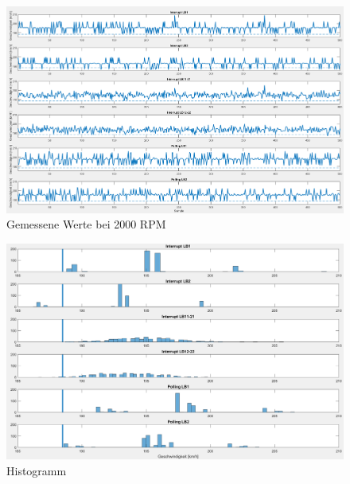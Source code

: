 \begin{figure}[H]
    \centering
    \includegraphics[width=\textwidth]{images/sig2000.png}
    \caption{Gemessene Werte bei 2000 RPM}
    \label{fig:sig2000}
\end{figure}
\begin{figure}[H]
    \centering
    \includegraphics[width=\textwidth]{images/hist2000.png}
    \caption{Histogramm}
    \label{fig:Hist}
\end{figure}

\clearpage


\clearpage
